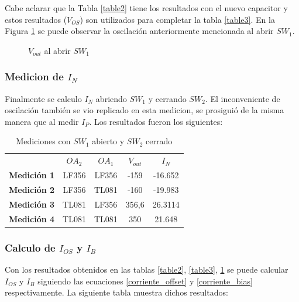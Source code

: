 Cabe aclarar que la Tabla \ref{table2} tiene los resultados con el nuevo capacitor y estos resultados ($V_{OS}$) son utilizados para completar la tabla \ref{table3}. 
En la Figura \ref{medicion} se puede observar la oscilación anteriormente mencionada al abrir $SW_1$. 

\begin{figure}[h!]                                                       
     \caption{$V_{out}$ al abrir $SW_1$}
     \label{medicion}
     \end{figure}

\subsubsection{Medicion de $I_{N}$}


Finalmente se calculo $I_N$ abriendo $SW_1$ y cerrando $SW_2$. El inconveniente de oscilación también se vio replicado en esta medicion, se prosiguió de la misma manera que al medir $I_P$.  
Los resultados fueron los siguientes:

\begin{table}[ht]
    \centering
    \caption{Mediciones con $SW_1$ abierto y $SW_2$ cerrado}
    \label{table4}
    \begin{tabular}{@{}ccccc@{}}
    \textbf{}           & \textbf{$OA_2$} & \textbf{$OA_1$} & \textbf{$V_{out}$} & \textbf{$I_N$} \\ 
    \textbf{Medición 1} & LF356          & LF356          & -159              &  -16.652            \\
    \textbf{Medición 2} & LF356          & TL081          & -160              &  -19.983            \\
    \textbf{Medición 3} & TL081          & LF356          & 356,6              &  26.3114            \\
    \textbf{Medición 4} & TL081          & TL081          & 350              &  21.648            \\ 
    \end{tabular}
\end{table}


\subsubsection{Calculo de $I_{OS}$ y $I_B$}

Con los resultados obtenidos en las tablas \ref{table2}, \ref{table3}, \ref{table4} se puede calcular $I_{OS}$ y $I_B$ siguiendo las ecuaciones \ref{corriente_offset} y \ref{corriente_bias} respectivamente. La siguiente tabla muestra dichos resultados:


